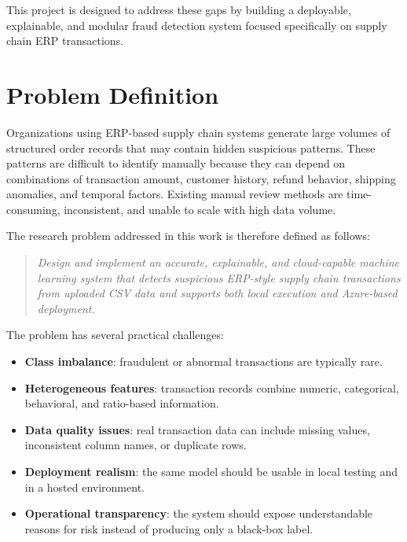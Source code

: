 \documentclass[a4paper,12pt]{article}
\begin{document}
This project is designed to address these gaps by building a deployable, explainable, and modular fraud detection system focused specifically on supply chain ERP transactions.

\section{Problem Definition}
Organizations using ERP-based supply chain systems generate large volumes of structured order records that may contain hidden suspicious patterns. These patterns are difficult to identify manually because they can depend on combinations of transaction amount, customer history, refund behavior, shipping anomalies, and temporal factors. Existing manual review methods are time-consuming, inconsistent, and unable to scale with high data volume.

The research problem addressed in this work is therefore defined as follows:

\begin{quote}
\textit{Design and implement an accurate, explainable, and cloud-capable machine learning system that detects suspicious ERP-style supply chain transactions from uploaded CSV data and supports both local execution and Azure-based deployment.}
\end{quote}

The problem has several practical challenges:
\begin{itemize}[noitemsep]
    \item \textbf{Class imbalance}: fraudulent or abnormal transactions are typically rare.
    \item \textbf{Heterogeneous features}: transaction records combine numeric, categorical, behavioral, and ratio-based information.
    \item \textbf{Data quality issues}: real transaction data can include missing values, inconsistent column names, or duplicate rows.
    \item \textbf{Deployment realism}: the same model should be usable in local testing and in a hosted environment.
    \item \textbf{Operational transparency}: the system should expose understandable reasons for risk instead of producing only a black-box label.
\end{itemize}
\end{document}
